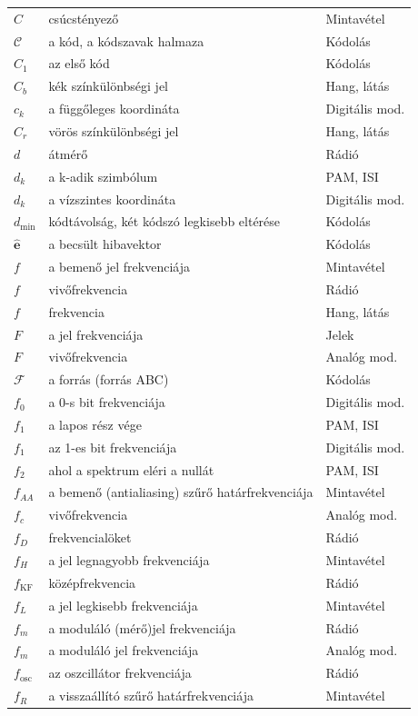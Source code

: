 {\begin{longtable}{@{}>{\raggedright\arraybackslash}p{2.4cm}>{\raggedright\arraybackslash}p{8.2cm}>{\raggedright\arraybackslash}p{3.8cm}@{}}
$C$ & csúcstényező & Mintavétel\\
$\mathcal C$ & a kód, a kódszavak halmaza & Kódolás\\
$C_1$ & az első kód & Kódolás\\
$C_b$ & kék színkülönbségi jel & Hang, látás\\
$c_k$ & a függőleges koordináta & Digitális mod.\\
$C_r$ & vörös színkülönbségi jel & Hang, látás\\
$d$ & átmérő & Rádió\\
$d_k$ & a k-adik szimbólum & PAM, ISI\\
$d_k$ & a vízszintes koordináta & Digitális mod.\\
$d_{\min}$ & kódtávolság, két kódszó legkisebb eltérése & Kódolás\\
$\hat{\mathbf e}$ & a becsült hibavektor & Kódolás\\
$f$ & a bemenő jel frekvenciája & Mintavétel\\
$f$ & vivőfrekvencia & Rádió\\
$f$ & frekvencia & Hang, látás\\
$F$ & a jel frekvenciája & Jelek\\
$F$ & vivőfrekvencia & Analóg mod.\\
$\mathcal F$ & a forrás (forrás ABC) & Kódolás\\
$f_0$ & a 0-s bit frekvenciája & Digitális mod.\\
$f_1$ & a lapos rész vége & PAM, ISI\\
$f_1$ & az 1-es bit frekvenciája & Digitális mod.\\
$f_2$ & ahol a spektrum eléri a nullát & PAM, ISI\\
$f_{AA}$ & a bemenő (antialiasing) szűrő határfrekvenciája & Mintavétel\\
$f_c$ & vivőfrekvencia & Analóg mod.\\
$f_D$ & frekvencialöket & Rádió\\
$f_H$ & a jel legnagyobb frekvenciája & Mintavétel\\
$f_\mathrm{KF}$ & középfrekvencia & Rádió\\
$f_L$ & a jel legkisebb frekvenciája & Mintavétel\\
$f_m$ & a moduláló (mérő)jel frekvenciája & Rádió\\
$f_m$ & a moduláló jel frekvenciája & Analóg mod.\\
$f_\text{osc}$ & az oszcillátor frekvenciája & Rádió\\
$f_R$ & a visszaállító szűrő határfrekvenciája & Mintavétel\\

\end{longtable}}
